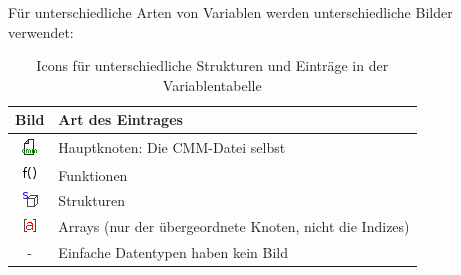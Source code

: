 Für unterschiedliche Arten von Variablen werden unterschiedliche Bilder verwendet:
\def\arraystretch{1.4}
\begin{table}[h!]
\center
\begin{tabular}{|cl|}
\hline 
Bild & Art des Eintrages \\ 
\hline
\includegraphics[scale=1.0]{./media/images/gui/var/icons/cmm.png} & Hauptknoten: Die CMM-Datei selbst \\
\includegraphics[scale=1.0]{./media/images/gui/var/icons/func.png} & Funktionen \\
\includegraphics[scale=1.0]{./media/images/gui/var/icons/struct.png} & Strukturen \\ 
\includegraphics[scale=1.0]{./media/images/gui/var/icons/array.png} & Arrays (nur der übergeordnete Knoten, nicht die Indizes) \\ 
- & Einfache Datentypen haben kein Bild\\
\hline 
\end{tabular}
\caption{Icons für unterschiedliche Strukturen und Einträge in der Variablentabelle}
\end{table}

